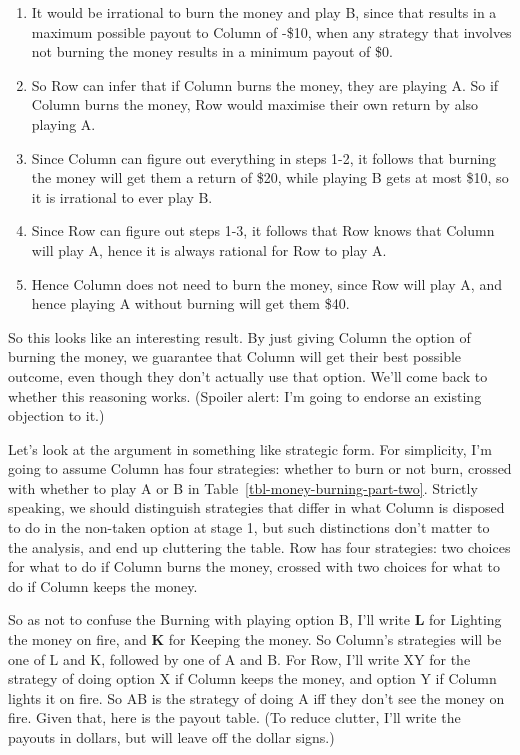 \documentclass[
  12pt,
  letterpaper,
  DIV=11,
  numbers=noendperiod]{scrreprt}
\providecommand{\tightlist}{%
  \setlength{\itemsep}{0pt}\setlength{\parskip}{0pt}}\usepackage{longtable,booktabs,array}
\begin{document}
\begin{enumerate}
\def\labelenumi{\arabic{enumi}.}
\tightlist
\item
  It would be irrational to burn the money and play B, since that
  results in a maximum possible payout to Column of -\$10, when any
  strategy that involves not burning the money results in a minimum
  payout of \$0.
\item
  So Row can infer that if Column burns the money, they are playing A.
  So if Column burns the money, Row would maximise their own return by
  also playing A.
\item
  Since Column can figure out everything in steps 1-2, it follows that
  burning the money will get them a return of \$20, while playing B gets
  at most \$10, so it is irrational to ever play B.
\item
  Since Row can figure out steps 1-3, it follows that Row knows that
  Column will play A, hence it is always rational for Row to play A.
\item
  Hence Column does not need to burn the money, since Row will play A,
  and hence playing A without burning will get them \$40.
\end{enumerate}

So this looks like an interesting result. By just giving Column the
option of burning the money, we guarantee that Column will get their
best possible outcome, even though they don't actually use that option.
We'll come back to whether this reasoning works. (Spoiler alert: I'm
going to endorse an existing objection to it.)

Let's look at the argument in something like strategic form. For
simplicity, I'm going to assume Column has four strategies: whether to
burn or not burn, crossed with whether to play A or B in
Table~\ref{tbl-money-burning-part-two}. Strictly speaking, we should
distinguish strategies that differ in what Column is disposed to do in
the non-taken option at stage 1, but such distinctions don't matter to
the analysis, and end up cluttering the table. Row has four strategies:
two choices for what to do if Column burns the money, crossed with two
choices for what to do if Column keeps the money.

So as not to confuse the Burning with playing option B, I'll write
\textbf{L} for Lighting the money on fire, and \textbf{K} for Keeping
the money. So Column's strategies will be one of L and K, followed by
one of A and B. For Row, I'll write XY for the strategy of doing option
X if Column keeps the money, and option Y if Column lights it on fire.
So AB is the strategy of doing A iff they don't see the money on fire.
Given that, here is the payout table. (To reduce clutter, I'll write the
payouts in dollars, but will leave off the dollar signs.)
\end{document}
